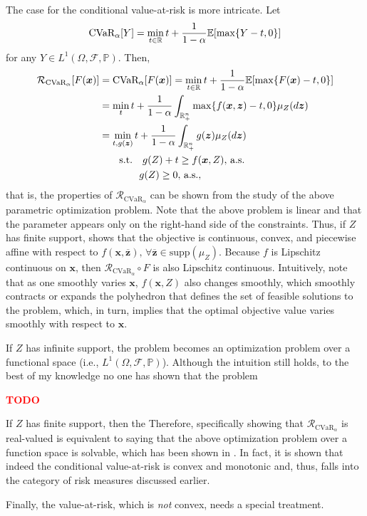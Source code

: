 \documentclass[12pt]{article}
\begin{document}
The case for the conditional value-at-risk is more intricate.
Let \[
    \text{CVaR}_\alpha[Y] = \min_{t\in \mathbb{R}} t + \frac{1}{1-\alpha} \mathbb{E}[\max\{Y-t,0\}]
\] for any $Y \in L^{1}(\Omega,\mathcal{F},\mathbb{P})$.
Then,
\begin{align*}
    \mathcal{R}_{\text{CVaR}_\alpha}[F(\bm{x})] &= \text{CVaR}_\alpha[F(\bm{x})] = \min_{t\in \mathbb{R}} t + \frac{1}{1-\alpha} \mathbb{E}[\max\{F(\bm{x})-t,0\}] \\
    &= \min_{t} t + \frac{1}{1-\alpha} \int_{\mathbb{R}^{n}_+} \max\{f(\bm{x},\bm{z})-t,0\} \mu_Z(d\bm{z}) \\
    &= \min_{t, g(\bm{z})} t + \frac{1}{1-\alpha} \int_{\mathbb{R}^{n}_+} g(\bm{z}) \mu_Z(d\bm{z}) \\
    &\quad\quad \text{s.t.} \quad g(Z) + t \ge f(\bm{x},Z),\, \text{a.s.} \\
    &\quad\quad \quad \quad g(Z) \ge 0,\, \text{a.s.}
,\end{align*}
that is, the properties of $\mathcal{R}_{\text{CVaR}_\alpha}$ can be shown from the study of the above parametric optimization problem.
Note that the above problem is linear and that the parameter appears only on the right-hand side of the constraints.
Thus, if $Z$ has finite support, \citep[Theorem~2.1]{pistikopoulosMultiparametricOptimizationControl2021} shows that the objective is continuous, convex, and piecewise affine with respect to $f(\bm{x},\overline{\bm{z}}),\,\forall \overline{\bm{z}}\in \text{supp}(\mu_Z)$.
Because $f$ is Lipschitz continuous on $\bm{x}$, then $\mathcal{R}_{\text{CVaR}_\alpha} \circ F$ is also Lipschitz continuous.
Intuitively, note that as one smoothly varies $\bm{x}$, $f(\bm{x},Z)$ also changes smoothly, which smoothly contracts or expands the polyhedron that defines the set of feasible solutions to the problem, which, in turn, implies that the optimal objective value varies smoothly with respect to $\bm{x}$.

If $Z$ has infinite support, the problem becomes an optimization problem over a functional space (i.e., $L^{1}(\Omega,\mathcal{F},\mathbb{P})$).
Although the intuition still holds, to the best of my knowledge no one has shown that the problem

\textcolor{red}{\textbf{TODO}}

If $Z$ has finite support, then the 
Therefore, specifically showing that $\mathcal{R}_{\text{CVaR}_\alpha}$ is real-valued is equivalent to saying that the above optimization problem over a function space is solvable, which has been shown in \citet[Chapter~6.2.4]{shapiroLecturesStochasticProgramming2009}.
In fact, it is shown that indeed the conditional value-at-risk is convex and monotonic and, thus, falls into the category of risk measures discussed earlier.

Finally, the value-at-risk, which is \emph{not} convex, needs a special treatment.






% 
\printbibliography
    
\end{document}
